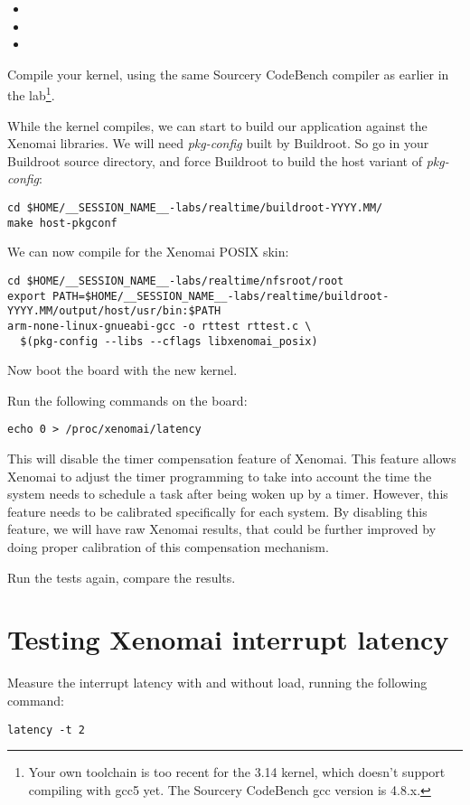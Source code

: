\begin{itemize}
\item {}
\item {}
\item {}
\end{itemize}

Compile your kernel, using the same Sourcery CodeBench compiler
as earlier in the lab\footnote{Your own toolchain is too recent
for the 3.14 kernel, which doesn't support compiling with gcc5 yet. The
Sourcery CodeBench gcc version is 4.8.x.}. 

While the kernel compiles, we can start to build our application against
the Xenomai libraries. We will need {\em pkg-config} built by Buildroot.
So go in your Buildroot source directory, and force Buildroot to build
the host variant of {\em pkg-config}:

\begin{verbatim}
cd $HOME/__SESSION_NAME__-labs/realtime/buildroot-YYYY.MM/
make host-pkgconf
\end{verbatim}

We can now compile  for the Xenomai POSIX skin:

\scriptsize
\begin{verbatim}
cd $HOME/__SESSION_NAME__-labs/realtime/nfsroot/root
export PATH=$HOME/__SESSION_NAME__-labs/realtime/buildroot-YYYY.MM/output/host/usr/bin:$PATH
arm-none-linux-gnueabi-gcc -o rttest rttest.c \
  $(pkg-config --libs --cflags libxenomai_posix)
\end{verbatim}
\normalsize

Now boot the board with the new kernel.

Run the following commands on the board:

\begin{verbatim}
echo 0 > /proc/xenomai/latency
\end{verbatim}

This will disable the timer compensation feature of Xenomai. This
feature allows Xenomai to adjust the timer programming to take into
account the time the system needs to schedule a task after being woken
up by a timer. However, this feature needs to be calibrated
specifically for each system. By disabling this feature, we will have
raw Xenomai results, that could be further improved by doing proper
calibration of this compensation mechanism.

Run the tests again, compare the results.

\section{Testing Xenomai interrupt latency}

Measure the interrupt latency with and without load, running the
following command:

\begin{verbatim}
latency -t 2
\end{verbatim}
